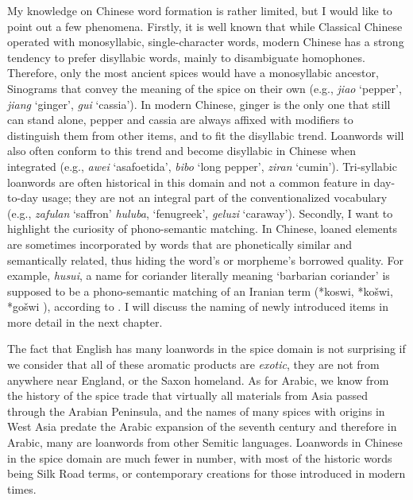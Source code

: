 My knowledge on Chinese word formation is rather limited, but I would like to point out a few phenomena. Firstly, it is well known that while Classical Chinese operated with monosyllabic, single-character words, modern Chinese has a strong tendency to prefer disyllabic words, mainly to disambiguate homophones. Therefore, only the most ancient spices would have a monosyllabic ancestor, Sinograms that convey the meaning of the spice on their own (e.g., \textit{jiao} `pepper', \textit{jiang} `ginger', \textit{gui} `cassia'). In modern Chinese, ginger is the only one that still can stand alone, pepper and cassia are always affixed with modifiers to distinguish them from other items, and to fit the disyllabic trend. Loanwords will also often conform to this trend and become disyllabic in Chinese when integrated (e.g., \textit{awei} `asafoetida', \textit{bibo} `long pepper', \textit{ziran} `cumin'). Tri-syllabic loanwords are often historical in this domain and not a common feature in day-to-day usage; they are not an integral part of the conventionalized vocabulary (e.g., \textit{zafulan} `saffron' \textit{huluba}, `fenugreek', \textit{geluzi} `caraway'). Secondly, I want to highlight the curiosity of phono-semantic matching. In Chinese, loaned elements are sometimes incorporated by words that are phonetically similar and semantically related, thus hiding the word's or morpheme's borrowed quality. For example, \textit{husui}, a name for coriander literally meaning `barbarian coriander' is supposed to be a phono-semantic matching of an Iranian term (*koswi, *košwi, *gošwi
), according to \textcite{laufer_sino-iranica_1919}.  
I will discuss the naming of newly introduced items in more detail in the next chapter.

The fact that English has many loanwords in the spice domain is not surprising if we consider that all of these aromatic products are \emph{exotic}, they are not from anywhere near England, or the Saxon homeland. As for Arabic, we know from the history of the spice trade that virtually all materials from Asia passed through the Arabian Peninsula, and the names of many spices with origins in West Asia predate the Arabic expansion of the seventh century and therefore in Arabic, many are loanwords from other Semitic languages. Loanwords in Chinese in the spice domain are much fewer in number, with most of the historic words being Silk Road terms, or contemporary creations for those introduced in modern times. 


